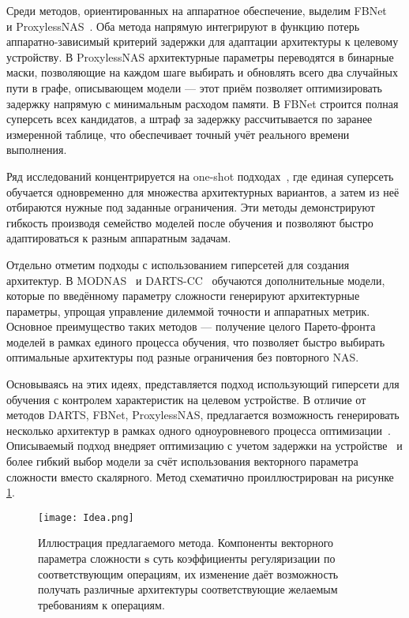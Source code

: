 \documentclass{article}
\begin{document}
Среди методов, ориентированных на аппаратное обеспечение, выделим FBNet ~\cite{Wu_2019_CVPR} и ProxylessNAS~\cite{proxylessnas}. Оба метода напрямую интегрируют в функцию потерь аппаратно-зависимый критерий задержки для адаптации архитектуры к целевому устройству. В ProxylessNAS архитектурные параметры переводятся в бинарные маски, позволяющие на каждом шаге выбирать и обновлять всего два случайных пути в графе, описывающем модели --- этот приём позволяет оптимизировать задержку напрямую с минимальным расходом памяти. %
В FBNet строится полная суперсеть всех кандидатов, а штраф за задержку рассчитывается по заранее измеренной таблице, что обеспечивает точный учёт реального времени выполнения. %

Ряд исследований концентрируется на one-shot подходах~\cite{Cai2020OnceForAll, Dong2021BigNAS}, где единая суперсеть обучается одновременно для множества архитектурных вариантов, а затем из неё отбираются нужные под заданные ограничения. Эти методы демонстрируют  гибкость производя семейство моделей после обучения и позволяют быстро адаптироваться к разным аппаратным задачам. %

Отдельно отметим подходы с использованием гиперсетей для создания архитектур. В MODNAS~\cite{Li2021MODNAS} и DARTS-CC~\cite{yakovlev2021neural} обучаются дополнительные модели, которые по введённому параметру сложности генерируют архитектурные параметры, упрощая управление дилеммой точности и аппаратных метрик. Основное преимущество таких методов --- получение целого Парето‐фронта моделей в рамках единого процесса обучения, что позволяет быстро выбирать оптимальные архитектуры под разные ограничения без повторного NAS.

Основываясь на этих идеях, представляется подход использующий гиперсети для обучения с контролем характеристик на целевом устройстве. В отличие от методов DARTS, FBNet, ProxylessNAS, предлагается возможность генерировать несколько архитектур в рамках одного одноуровневого процесса оптимизации~\cite{yakovlev2021neural,Li2021MODNAS}. Описываемый подход внедряет оптимизацию с учетом задержки на устройстве~\cite{Wu_2019_CVPR,proxylessnas} и более гибкий выбор модели за счёт использования векторного параметра сложности вместо скалярного. Метод схематично проиллюстрирован на рисунке \ref{fig1}.  
\begin{figure}[!ht]
    \centering
    \texttt{[image: Idea.png]}
    \caption{Иллюстрация предлагаемого метода. Компоненты векторного параметра сложности $\boldsymbol{s}$ суть коэффициенты регуляризации по соответствующим операциям, их изменение даёт возможность получать различные архитектуры соответствующие желаемым требованиям к операциям. }
    \label{fig1}
\end{figure}
\end{document}
